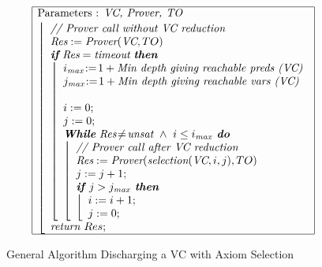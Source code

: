 \documentclass{acm_proc_article-sp}
\theoremstyle{nonumberplain}
\newcommand{\TO}{TO}
\begin{document}
\begin{figure}\footnotesize
  \[
  \begin{array}{|l|}
    \hline
    \textnormal{Parameters : }\textit{VC, Prover, \TO}\\[2pt]
    \left\lfloor
      \begin{array}{l}
        \textit{// Prover call without VC reduction}\\
        \textit{Res}:=\textit{Prover}(\textit{VC}, \TO)\\ 
        \textit{\textbf{if}} ~ \textit{Res} = \textit{timeout} ~ \textit{\textbf{then}} \\
        \left\lfloor
          \begin{array}{l}            
            i_\textit{max} \!:=\! 1+\textit{Min depth giving reachable preds (VC)}\!\!\!\!\\
            j_\textit{max} \!:=\! 1+\textit{Min depth giving reachable vars (VC)}\!\!\!\!\\
            \\
            i:=0 ;\\
            j:=0 ;\\
            \textit{\textbf{While}} ~ \textit{Res} \!\neq\! \textit{unsat}  
            ~\land~ i\le i_\textit{max} \textit{\textbf{ do}}\\
            \left\lfloor
              \begin{array}{l}
                \textit{// Prover call after VC reduction}\\
                \textit{Res}:=\textit{Prover}(\textit{selection$(\textit{VC},i,j)$},
                \TO)\!\!\!\!\!\!\!\!\!\!\!\!\\ 
                j:=j+1 ;\\
                \textit{\textbf{if }}j>j_\textit{max}\textit{\textbf{ then }} \\
                \left\lfloor
                  \begin{array}{l}
                    i:=i+1 ; \\
                    j:=0 ;
                  \end{array}\right.
              \end{array}\right.\\
          \end{array}\right.\\
        \textit{return }Res;
      \end{array}\right.\\[2pt]
    \hline
  \end{array}
  \]
  \caption{General Algorithm Discharging a VC with Axiom Selection}
  \label{fig:algorithm}
\end{figure}
\end{document}
